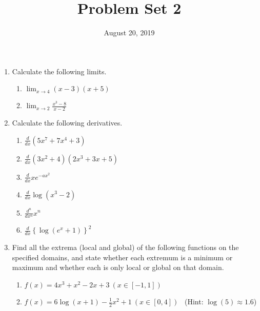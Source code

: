 \documentclass[pdflatex, letterpaper, 12pt]{scrartcl}
\title{Problem Set 2}
\date{August 20, 2019}
\begin{document}
\maketitle

\begin{enumerate}
\item Calculate the following limits.
 \begin{enumerate}[label=(\alph*)]
 \item $\lim_{x \to 4} (x- 3)(x + 5)$
 \item $\lim_{x \to 2} \frac{x^3 - 8}{x - 2}$
 \end{enumerate}

 \item Calculate the following derivatives.
 \begin{enumerate}[label=(\alph*)]
 \item $\frac{d}{dx} (5x^7 + 7x^4 + 3)$
 \item $\frac{d}{dx} (3x^2 + 4)(2x^3 + 3x + 5)$
 \item $\frac{d}{dx} xe^{-ax^2}$
 \item $\frac{d}{dx} \log(x^3 - 2)$
 \item $\frac{d^n}{dx^n} x^n$
 \item $\frac{d}{dx} \left\{\log(e^x + 1)\right\}^2 $
 \end{enumerate}

\item Find all the extrema (local and global) of the following functions on the specified domains, and state whether each extremum is a minimum or maximum and whether each is only local or global on that domain.
 \begin{enumerate}[label=(\alph*)]
 \item $f(x) = 4x^3 + x^2 - 2x + 3 \ (x \in [-1, 1])$
 \item $f(x) = 6\log(x + 1) - \frac{1}{2}x^2 + 1 \ (x \in [0, 4])$ \ (Hint: $\log(5) \approx 1.6$)
 \end{enumerate}
 

\end{enumerate}
\end{document}

